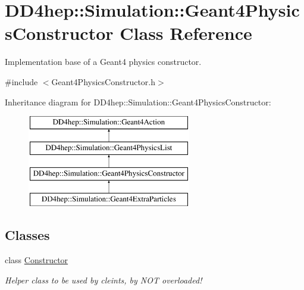\hypertarget{class_d_d4hep_1_1_simulation_1_1_geant4_physics_constructor}{}\section{D\+D4hep\+:\+:Simulation\+:\+:Geant4\+Physics\+Constructor Class Reference}
\label{class_d_d4hep_1_1_simulation_1_1_geant4_physics_constructor}


Implementation base of a Geant4 physics constructor.  




{\ttfamily \#include $<$Geant4\+Physics\+Constructor.\+h$>$}

Inheritance diagram for D\+D4hep\+:\+:Simulation\+:\+:Geant4\+Physics\+Constructor\+:\begin{figure}[H]
\begin{center}
\leavevmode
\includegraphics[height=4.000000cm]{class_d_d4hep_1_1_simulation_1_1_geant4_physics_constructor}
\end{center}
\end{figure}
\subsection*{Classes}
\begin{DoxyCompactItemize}
\item 
class \hyperlink{class_d_d4hep_1_1_simulation_1_1_geant4_physics_constructor_1_1_constructor}{Constructor}
\begin{DoxyCompactList}\small\item\em Helper class to be used by cleints, by N\+OT overloaded! \end{DoxyCompactList}\end{DoxyCompactItemize}
